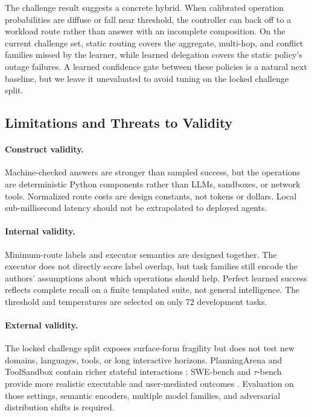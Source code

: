 \documentclass[letterpaper]{article} %
\begin{document}
The challenge result suggests a concrete hybrid. When calibrated operation probabilities are diffuse or fall near threshold, the controller can back off to a workload route rather than answer with an incomplete composition. On the current challenge set, static routing covers the aggregate, multi-hop, and conflict families missed by the learner, while learned delegation covers the static policy's outage failures. A learned confidence gate between these policies is a natural next baseline, but we leave it unevaluated to avoid tuning on the locked challenge split.

\subsection{Limitations and Threats to Validity}

\paragraph{Construct validity.}
Machine-checked answers are stronger than sampled success, but the operations are deterministic Python components rather than LLMs, sandboxes, or network tools. Normalized route costs are design constants, not tokens or dollars. Local sub-millisecond latency should not be extrapolated to deployed agents.

\paragraph{Internal validity.}
Minimum-route labels and executor semantics are designed together. The executor does not directly score label overlap, but task families still encode the authors' assumptions about which operations should help. Perfect learned success reflects complete recall on a finite templated suite, not general intelligence. The threshold and temperatures are selected on only 72 development tasks.

\paragraph{External validity.}
The locked challenge split exposes surface-form fragility but does not test new domains, languages, tools, or long interactive horizons. PlanningArena and ToolSandbox contain richer stateful interactions \citep{zheng2025planningarena,lu2025toolsandbox}; SWE-bench and $\tau$-bench provide more realistic executable and user-mediated outcomes \citep{jimenez2024swebench,yao2024taubench}. Evaluation on those settings, semantic encoders, multiple model families, and adversarial distribution shifts is required.
\end{document}
